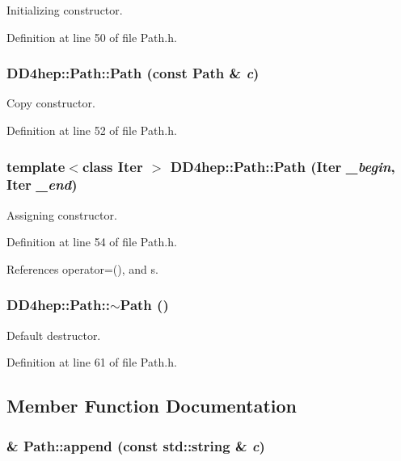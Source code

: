 Initializing constructor. 

Definition at line 50 of file Path.h.\hypertarget{class_d_d4hep_1_1_path_aacc0beb72c34b440b89ef40eeec0fe97}{
\subsubsection[{Path}]{\setlength{\rightskip}{0pt plus 5cm}DD4hep::Path::Path (const {\bf Path} \& {\em c})}}
\label{class_d_d4hep_1_1_path_aacc0beb72c34b440b89ef40eeec0fe97}


Copy constructor. 

Definition at line 52 of file Path.h.\hypertarget{class_d_d4hep_1_1_path_a2f6484e284fb7e603c15dc3ef4cb15e8}{
\subsubsection[{Path}]{\setlength{\rightskip}{0pt plus 5cm}template$<$class Iter $>$ DD4hep::Path::Path (Iter {\em \_\-begin}, \/  Iter {\em \_\-end})}}
\label{class_d_d4hep_1_1_path_a2f6484e284fb7e603c15dc3ef4cb15e8}


Assigning constructor. 

Definition at line 54 of file Path.h.

References operator=(), and s.\hypertarget{class_d_d4hep_1_1_path_ac39064d1578702ce969c7b1e1bcb5912}{
\subsubsection[{$\sim$Path}]{\setlength{\rightskip}{0pt plus 5cm}DD4hep::Path::$\sim$Path ()}}
\label{class_d_d4hep_1_1_path_ac39064d1578702ce969c7b1e1bcb5912}


Default destructor. 

Definition at line 61 of file Path.h.

\subsection{Member Function Documentation}
\hypertarget{class_d_d4hep_1_1_path_aede85dabc3b61fe22482f3fcf4fd8fad}{
\subsubsection[{append}]{ \& Path::append (const std::string \& {\em c})}}
\label{class_d_d4hep_1_1_path_aede85dabc3b61fe22482f3fcf4fd8fad}


